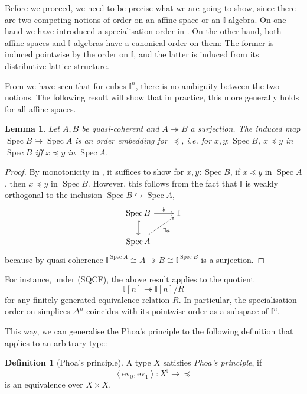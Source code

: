 \documentclass[12pt]{amsart}
\newtheorem{lemma}[theorem]{Lemma}
\theoremstyle{definition}
\newtheorem{definition}[theorem]{Definition}
\newcommand{\mbb}[1]{\mathbb{#1}}
\newcommand{\I}{\mbb I}
\newcommand{\pair}[1]{\left\langle#1\right\rangle}
\newcommand{\ev}{\mathrm{ev}}
\newcommand{\surj}{\twoheadrightarrow}
\newcommand{\hook}{\hookrightarrow}
\newcommand{\spec}{\operatorname{Spec}}
\begin{document}
Before we proceed, we need to be precise what we are going to show, since there are two competing notions of order on an affine space or an $\I$-algebra. On one hand we have introduced a specialisation order in . On the other hand, both affine spaces and $\I$-algebras have a canonical order on them: The former is induced pointwise by the order on $\I$, and the latter is induced from its distributive lattice structure. 

From  we have seen that for cubes $\I^n$, there is no ambiguity between the two notions. The following result will show that in practice, this more generally holds for all affine spaces.

\begin{lemma}\label{lem:orderonaffine}
  Let $A,B$ be quasi-coherent and $A \surj B$ a surjection. The induced map $\spec B \hook \spec A$ is an order embedding for $\preceq$, i.e. for $x,y : \spec B$, $x \preceq y$ in $\spec B$ iff $x \preceq y$ in $\spec A$.
\end{lemma}
\begin{proof}
  By monotonicity in , it suffices to show for $x,y : \spec B$, if $x \preceq y$ in $\spec A$, then $x \preceq y$ in $\spec B$. However, this follows from the fact that $\I$ is weakly orthogonal to the inclusion $\spec B \hook \spec A$,
  \[
  \begin{tikzcd}
    \spec B \ar[d, hook] \ar[r, "b"] & \I \\ 
    \spec A \ar[ur, dashed, "\exists a"'] 
  \end{tikzcd}
  \]
  because by quasi-coherence $\I^{\spec A} \cong A \surj B \cong \I^{\spec B}$ is a surjection. 
\end{proof}

For instance, under (SQCF), the above result applies to the quotient 
\[ \I[n] \surj \I[n]/R \]
for any finitely generated equivalence relation $R$. In particular, the specialisation order on simplices $\Delta^n$ coincides with its pointwise order as a subspace of $\I^n$.

This way, we can generalise the Phoa's principle to the following definition that applies to an arbitrary type:

\begin{definition}[Phoa's principle]\label{def:phoa}
  A type $X$ satisfies \emph{Phoa's principle}, if 
  \[ \pair{\ev_0,\ev_1} : X^\I \to \operatorname{\preceq} \]
  is an equivalence over $X \times X$.
\end{definition}
\end{document}
